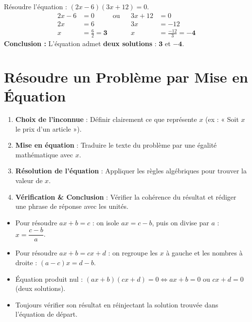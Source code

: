 \begin{cadremethode}[Résoudre une équation produit nul $(ax+b)(cx+d)=0$]
Résoudre l'équation : $(2x - 6)(3x + 12) = 0$.
\begin{align*}
2x - 6 &= 0 & \text{ou} & & 3x + 12 &= 0 \\
2x &= 6 & & & 3x &= -12 \\
x &= \frac{6}{2} = \mathbf{3} & & & x &= \frac{-12}{3} = \mathbf{-4}
\end{align*}
\textbf{Conclusion :} L'équation admet \textbf{deux solutions} : $\mathbf{3}$ et $\mathbf{-4}$.
\end{cadremethode}

\section{Résoudre un Problème par Mise en Équation}

\begin{cadremethode}
\begin{enumerate}
    \item \textbf{Choix de l'inconnue} : Définir clairement ce que représente $x$ (ex : « Soit $x$ le prix d'un article »).
    \item \textbf{Mise en équation} : Traduire le texte du problème par une égalité mathématique avec $x$.
    \item \textbf{Résolution de l'équation} : Appliquer les règles algébriques pour trouver la valeur de $x$.
    \item \textbf{Vérification \& Conclusion} : Vérifier la cohérence du résultat et rédiger une phrase de réponse avec les unités.
\end{enumerate}
\end{cadremethode}

\begin{cadreretenu}
\begin{itemize}
    \item Pour résoudre $ax + b = c$ : on isole $ax = c - b$, puis on divise par $a$ : $x = \dfrac{c-b}{a}$.
    \item Pour résoudre $ax + b = cx + d$ : on regroupe les $x$ à gauche et les nombres à droite : $(a-c)x = d-b$.
    \item Équation produit nul : $(ax+b)(cx+d) = 0 \iff ax+b=0 \text{ ou } cx+d=0$ (deux solutions).
    \item Toujours vérifier son résultat en réinjectant la solution trouvée dans l'équation de départ.
\end{itemize}
\end{cadreretenu}

